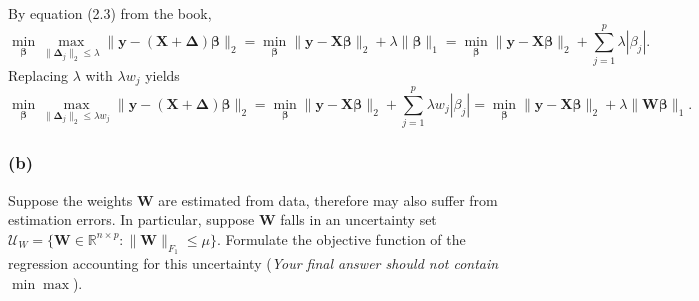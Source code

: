 \documentclass{article}%
\begin{document}
\begin{solution}
By equation (2.3) from the book, 
\begin{equation}
    \min_{\boldsymbol{\beta}} \max_{ \|\mathbf{\Delta}_j \|_2 \le \lambda} 
    \| \mathbf{y} - (\mathbf{X} + \mathbf{\Delta} )\boldsymbol{\beta} \|_2 = \min_{\boldsymbol{\beta}} \| \mathbf{y} - \mathbf{X} \boldsymbol{\beta} \|_2 + \lambda \|\boldsymbol{\beta}\|_1 = \min_{\boldsymbol{\beta}} \| \mathbf{y} - \mathbf{X} \boldsymbol{\beta} \|_2 + \sum_{j=1}^p \lambda |\beta_j|.
\end{equation}
Replacing $\lambda$ with $\lambda w_j$ yields 
\begin{equation}
    \min_{\boldsymbol{\beta}} \max_{ \|\mathbf{\Delta}_j \|_2 \le \lambda w_j} 
    \| \mathbf{y} - (\mathbf{X} + \mathbf{\Delta} )\boldsymbol{\beta} \|_2 = \min_{\boldsymbol{\beta}} \| \mathbf{y} - \mathbf{X} \boldsymbol{\beta} \|_2 + \sum_{j=1}^p \lambda w_j |\beta_j| = \min_{\boldsymbol{\beta}} \| \mathbf{y} - \mathbf{X} \boldsymbol{\beta} \|_2 + \lambda  \|\mathbf{W}\boldsymbol{\beta} \|_1.
\end{equation}
\end{solution}

\subsubsection*{(b)}
Suppose the weights $\mathbf{W}$ are estimated from data, therefore may also suffer from estimation errors. In particular, suppose $\mathbf{W}$ falls in an uncertainty set $\mathcal{U}_W = \{\mathbf{W} \in \mathbb{R}^{n\times p}:  \|\mathbf{W}\|_{F_1} \le \mu \}$. Formulate the objective function of the regression accounting for this uncertainty (\emph{Your final answer should not contain $\min \max$}).
\end{document}
